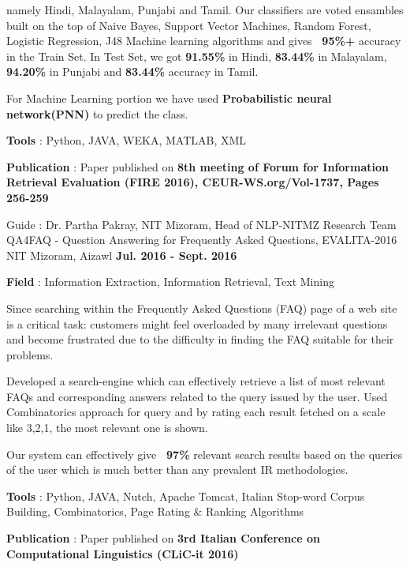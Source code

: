 \begin{cventries}
{\begin{cvitems}
{namely Hindi, Malayalam, Punjabi and Tamil. Our classifiers are voted ensambles built on the top of Naive Bayes, Support Vector Machines,
Random Forest, Logistic Regression, J48 Machine learning algorithms and gives \textbf{~95\%+} accuracy in the Train Set. In Test Set, we got \textbf{91.55\%} in Hindi, \textbf{83.44\%} in Malayalam, \textbf{94.20\%} in Punjabi and \textbf{83.44\%} accuracy in Tamil.}
    \item{For Machine Learning portion we have used \textbf{Probabilistic neural network(PNN)} to predict the class.}
    \item{\textbf{Tools} : Python, JAVA, WEKA, MATLAB, XML}
    \item{\textbf{Publication} : Paper published on \textbf{8th meeting of Forum for Information Retrieval Evaluation (FIRE 2016), CEUR-WS.org/Vol-1737, Pages 256-259 }}
      \end{cvitems}
    }
          \cventry
    {Guide : Dr. Partha Pakray, NIT Mizoram, Head of NLP-NITMZ Research Team}
    {QA4FAQ - Question Answering for Frequently Asked Questions, EVALITA-2016}
    {NIT Mizoram, Aizawl}
    {\textbf{Jul. 2016 - Sept. 2016}}
    {
      \begin{cvitems}
        \item{\textbf{Field} : Information Extraction, Information Retrieval, Text Mining}
        \item{Since searching within the Frequently Asked Questions (FAQ) page of a web site is a critical task: customers might feel overloaded by many irrelevant questions and become frustrated due to the difficulty in finding the FAQ suitable for their problems.}
        \item{Developed a search-engine which can effectively retrieve a list of most relevant FAQs and corresponding answers related to the query issued by the user. Used Combinatorics approach for query and by rating each result fetched on a scale like 3,2,1, the most relevant one is shown.}
        \item{Our system can effectively give \textbf{~97\%} relevant search results based on the queries of the user which is much better than any prevalent IR methodologies.}
        \item{\textbf{Tools} : Python, JAVA, Nutch, Apache Tomcat, Italian Stop-word Corpus Building, Combinatorics, Page Rating \& Ranking Algorithms}
        \item{\textbf{Publication} : Paper published on \textbf{3rd Italian Conference on Computational Linguistics (CLiC-it 2016)} }
      \end{cvitems} 
    }
 

\end{cventries}
